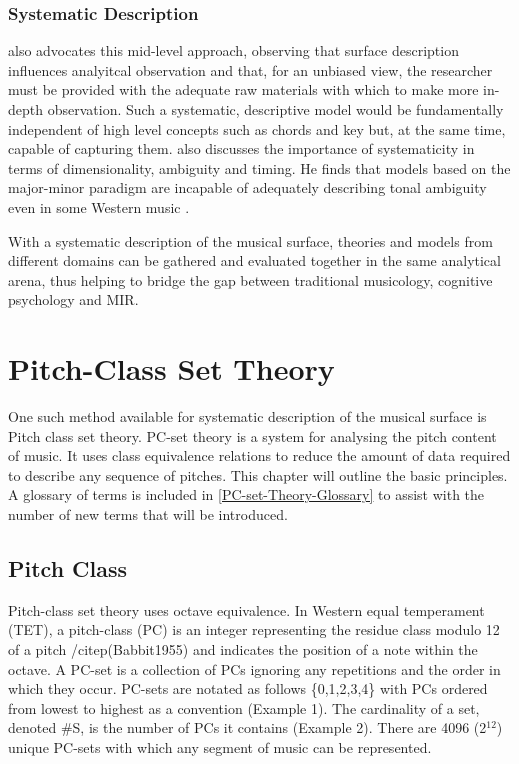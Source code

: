 \documentclass{article}
\begin{document}
\subsubsection{Systematic Description}
\label{sec-2-4-2}

\citet{Martorell2013} also advocates this mid-level approach,
observing that surface description influences analyitcal observation
and that, for an unbiased view, the researcher must be provided with
the adequate raw materials with which to make more in-depth
observation. Such a systematic, descriptive model would be
fundamentally independent of high level concepts such as chords and
key but, at the same time, capable of capturing
them. \citet{Martorell2013} also discusses the importance of
systematicity in terms of dimensionality, ambiguity and timing. He
finds that models based on the major-minor paradigm are incapable of
adequately describing tonal ambiguity even in some Western music
\citep[chap. 3]{Martorell2013}.

With a systematic description of the musical surface, theories and
models from different domains can be gathered and evaluated together in
the same analytical arena, thus helping to bridge the gap between
traditional musicology, cognitive psychology and MIR.
\section{Pitch-Class Set Theory}
\label{sec-3}

One such method available for systematic description of the musical
surface is Pitch class set theory. PC-set theory is a system for
analysing the pitch content of music. It uses class equivalence
relations to reduce the amount of data required to describe any
sequence of pitches. This chapter will outline the basic principles. A
glossary of terms is included in \ref{PC-set-Theory-Glossary} to assist with
the number of new terms that will be introduced.
\subsection{Pitch Class}
\label{sec-3-1}

Pitch-class set theory uses octave equivalence. In Western equal
temperament (TET), a pitch-class (PC) is an integer representing the
residue class modulo 12 of a pitch /citep(Babbit1955) and indicates
the position of a note within the octave. A PC-set is a collection of
PCs ignoring any repetitions and the order in which they
occur. PC-sets are notated as follows \{0,1,2,3,4\} with PCs ordered
from lowest to highest as a convention (Example 1). The cardinality of
a set, denoted \#S, is the number of PCs it contains (Example 2). There
are 4096 (2$^{\mathrm{12}}$) unique PC-sets with which any segment of music can be
represented.
\end{document}
